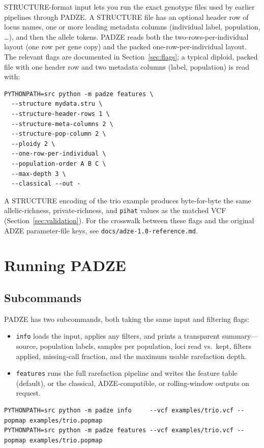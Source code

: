 \documentclass[11pt]{article}
\newcommand{\padze}{PADZE}
\begin{document}
STRUCTURE-format input lets you run the exact genotype files used by earlier
pipelines through \padze{}. A STRUCTURE file has an optional header row of locus
names, one or more leading metadata columns (individual label, population,
\ldots), and then the allele tokens. \padze{} reads both the
two-rows-per-individual layout (one row per gene copy) and the packed
one-row-per-individual layout. The relevant flags are documented in
Section~\ref{sec:flags}; a typical diploid, packed file with one header row and
two metadata columns (label, population) is read with:
\begin{lstlisting}[style=cmd]
PYTHONPATH=src python -m padze features \
  --structure mydata.stru \
  --structure-header-rows 1 \
  --structure-meta-columns 2 \
  --structure-pop-column 2 \
  --ploidy 2 \
  --one-row-per-individual \
  --population-order A B C \
  --max-depth 3 \
  --classical --out -
\end{lstlisting}

A STRUCTURE encoding of the trio example produces byte-for-byte the same
allelic-richness, private-richness, and \texttt{pihat} values as the matched VCF
(Section~\ref{sec:validation}). For the crosswalk between these flags and the
original ADZE parameter-file keys, see \texttt{docs/adze-1.0-reference.md}.

\section{Running \padze{}}
\label{sec:running}

\subsection{Subcommands}
\label{sec:subcommands}

\padze{} has two subcommands, both taking the same input and filtering flags:
\begin{itemize}
  \item \texttt{info} loads the input, applies any filters, and prints a
        transparent summary---source, population labels, samples per population,
        loci read vs.\ kept, filters applied, missing-call fraction, and the
        maximum usable rarefaction depth.
  \item \texttt{features} runs the full rarefaction pipeline and writes the
        feature table (default), or the classical, ADZE-compatible, or
        rolling-window outputs on request.
\end{itemize}
\begin{lstlisting}[style=cmd]
PYTHONPATH=src python -m padze info     --vcf examples/trio.vcf --popmap examples/trio.popmap
PYTHONPATH=src python -m padze features --vcf examples/trio.vcf --popmap examples/trio.popmap
\end{lstlisting}
\end{document}
